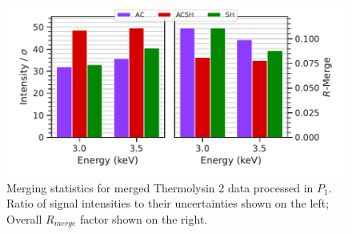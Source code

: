 \begin{figure}[]
    \centering
    \includegraphics{plots/exp1/tlys_2_P1/stats.pdf}
    \caption{Merging statistics for merged Thermolysin 2 data processed in $P_1$. Ratio of signal intensities to their uncertainties shown on the left; Overall $R_{merge}$ factor shown on the right.}
    \label{fig:tlys_2_p1}
\end{figure}

